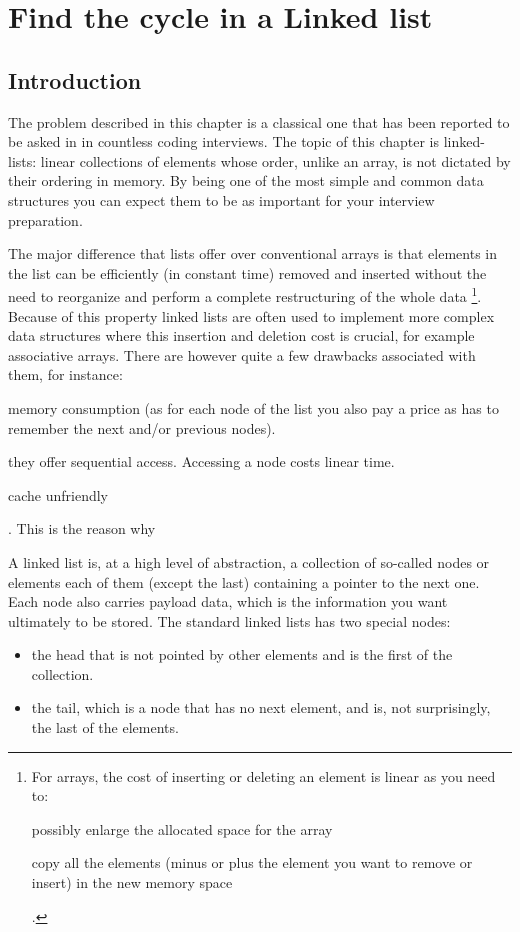 %

\chapter{Find the cycle in a Linked list}
\label{ch:cycle_in_list}
\section*{Introduction}
The problem described in this chapter is a classical one that has been reported to be asked in 
in countless coding interviews. The topic of this chapter is linked-lists: linear collections of elements whose order, unlike an array,
is not dictated by their ordering in memory. 
By being one of the most simple and common data structures you can expect them to be as important for your interview preparation.

The major difference that lists offer over conventional arrays is that elements in the list can be efficiently  (in constant time) 
removed and inserted without the need to reorganize and perform a complete restructuring of the whole data \footnote{For arrays, the cost of inserting or deleting an element is linear as you need to:
\begin{enumerate*}
	\item possibly enlarge the allocated space for the array
	\item copy all the elements (minus or plus the element you want to remove or insert) in the new memory space
\end{enumerate*}.
}. Because of this property linked lists are often used to implement more complex data structures 
where this insertion and deletion cost is crucial, for example associative arrays.
There are however quite a few drawbacks associated with them, for instance:
\begin{enumerate*}
	\item memory consumption (as for each node of the list you also pay a price as has to remember the next and/or previous nodes).
	\item they offer sequential access. Accessing a node costs linear time.
	\item cache unfriendly
\end{enumerate*}. This is the reason why  

A linked list is, at a high level of abstraction, a collection of so-called nodes or elements  each of them (except the last) containing
a pointer to the next one. 
Each node also carries payload data, which is the information you want ultimately to be stored.
The standard linked lists has two special nodes:
\begin{itemize}
	\item the head that is not pointed by other elements and is the first of the collection. 
	\item the tail, which is a node that has no next element, and is, not surprisingly, the last of the elements.
\end{itemize}

